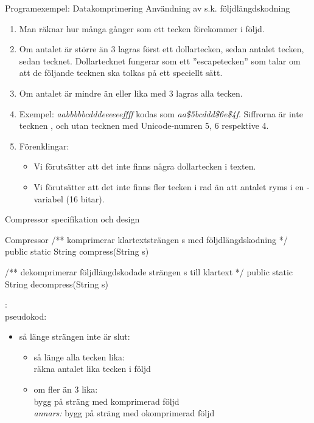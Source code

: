 \documentclass{lecturenotes}
\begin{document}
\begin{Slide}{Programexempel: Datakomprimering}
Användning av s.k. följdlängdskodning\\
\begin{enumerate} \footnotesize
 \item Man räknar hur många gånger som ett tecken förekommer i följd.
 \item Om antalet är större än 3 lagras först ett dollartecken, sedan antalet tecken, sedan tecknet. Dollartecknet fungerar som ett ''escapetecken'' som talar om att de följande tecknen ska tolkas på ett speciellt sätt. 
 \item Om antalet är mindre än eller lika med 3 lagras alla tecken.
 \item Exempel: \textsl{aabbbbbcdddeeeeeeffff} kodas som \textsl{aa\$5bcddd\$6e\$4f}. Siffrorna är inte tecknen ,  och  utan tecknen med Unicode-numren 5, 6 respektive 4.
\item Förenklingar: 
\begin{itemize} \footnotesize
\item Vi förutsätter att det inte finns några dollartecken i texten.
\item Vi förutsätter att det inte finns fler tecken i rad än att antalet ryms i en -variabel (16 bitar).
\end{itemize}
\end{enumerate}
\end{Slide} 

\begin{Slide}{Compressor specifikation och design}
\begin{ClassSpec}{Compressor}
/** komprimerar klartextsträngen s med följdlängdskodning */
public static String compress(String s) 

/** dekomprimerar följdlängdskodade strängen s till klartext  */
public static String decompress(String s)
\end{ClassSpec}

: \\ pseudokod:
\begin{itemize} 
\item så länge strängen inte är slut:
\begin{itemize} 
\item så länge alla tecken lika:\\ räkna antalet lika tecken i följd
\item om fler än 3 lika: \\ 
bygg på sträng med komprimerad följd \\
\textit{annars:} bygg på sträng med okomprimerad följd

\end{itemize}
\end{itemize}
\end{Slide}
\end{document}
